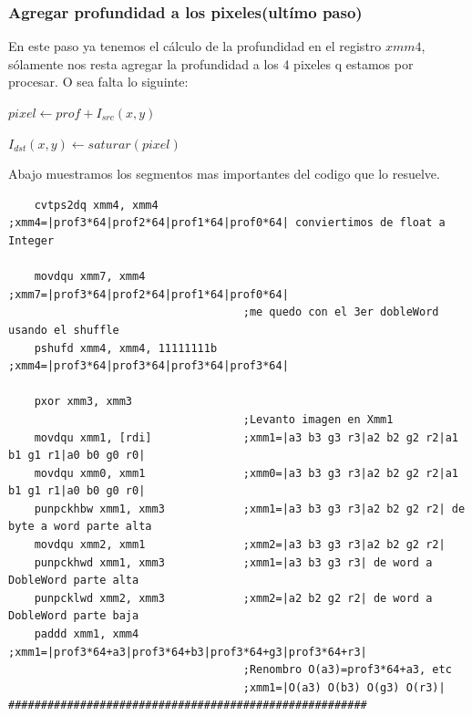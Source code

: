 \subsubsection*{Agregar profundidad a los pixeles(ultímo paso)}
En este paso ya tenemos el cálculo de la profundidad en el registro $xmm4$, sólamente nos resta agregar la profundidad a los 4 pixeles q estamos por procesar. O sea falta lo siguinte:
\begin{center}
       $pixel \gets prof + I_{src}(x, y)$    
      
      $I_{dst}(x, y) \gets saturar(pixel)$
\end{center}
Abajo muestramos los segmentos mas importantes del codigo que lo resuelve.
\begin{codesnippet}
\begin{verbatim}
    cvtps2dq xmm4, xmm4             ;xmm4=|prof3*64|prof2*64|prof1*64|prof0*64| conviertimos de float a Integer

    movdqu xmm7, xmm4               ;xmm7=|prof3*64|prof2*64|prof1*64|prof0*64|
                                    ;me quedo con el 3er dobleWord usando el shuffle
    pshufd xmm4, xmm4, 11111111b    ;xmm4=|prof3*64|prof3*64|prof3*64|prof3*64|

    pxor xmm3, xmm3
                                    ;Levanto imagen en Xmm1
    movdqu xmm1, [rdi]              ;xmm1=|a3 b3 g3 r3|a2 b2 g2 r2|a1 b1 g1 r1|a0 b0 g0 r0|			
    movdqu xmm0, xmm1               ;xmm0=|a3 b3 g3 r3|a2 b2 g2 r2|a1 b1 g1 r1|a0 b0 g0 r0|
    punpckhbw xmm1, xmm3            ;xmm1=|a3 b3 g3 r3|a2 b2 g2 r2| de byte a word parte alta
    movdqu xmm2, xmm1               ;xmm2=|a3 b3 g3 r3|a2 b2 g2 r2| 
    punpckhwd xmm1, xmm3            ;xmm1=|a3 b3 g3 r3| de word a DobleWord parte alta
    punpcklwd xmm2, xmm3            ;xmm2=|a2 b2 g2 r2| de word a DobleWord parte baja
    paddd xmm1, xmm4                ;xmm1=|prof3*64+a3|prof3*64+b3|prof3*64+g3|prof3*64+r3|
                                    ;Renombro O(a3)=prof3*64+a3, etc
                                    ;xmm1=|O(a3) O(b3) O(g3) O(r3)|
#######################################################
    

\end{verbatim}
\end{codesnippet}
